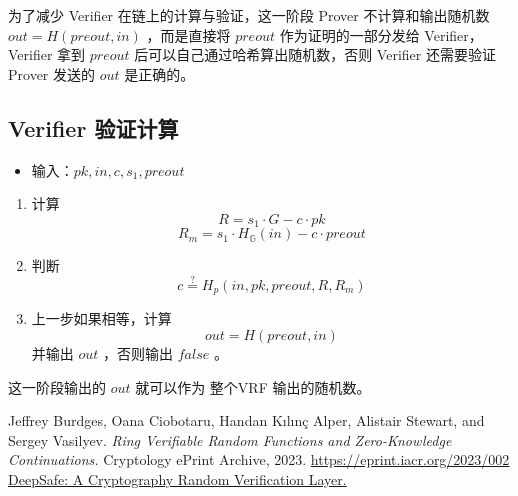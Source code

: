 \documentclass[10pt]{ctexart}
\begin{document}
为了减少 Verifier 在链上的计算与验证，这一阶段 Prover 不计算和输出随机数 $out = H(preout, in)$ ，而是直接将 $preout$ 作为证明的一部分发给 Verifier，Verifier 拿到 $preout$ 后可以自己通过哈希算出随机数，否则 Verifier 还需要验证 Prover 发送的 $out$ 是正确的。

\subsection{Verifier 验证计算}

\begin{itemize}
    \item 输入：$pk, in, c, s_1, preout$
\end{itemize}

\begin{enumerate}
    \item 计算 \[R = s_1 \cdot G - c \cdot pk\] \[R_m = s_1 \cdot  H_{\mathbb{G}}(in) - c \cdot preout\] 
    \item 判断 \[c \overset{?}{=} H_p(in, pk, preout, R, R_m)\]
    \item 上一步如果相等，计算 \[out = H(preout, in)\]并输出 $out$ ，否则输出 $false$ 。
\end{enumerate}

这一阶段输出的 $out$ 就可以作为 整个VRF 输出的随机数。


\begin{thebibliography}{10}
    Jeffrey Burdges, Oana Ciobotaru, Handan Kılınç Alper, Alistair Stewart, and Sergey Vasilyev.
    \textit{Ring Verifiable Random Functions and Zero-Knowledge Continuations.}
    Cryptology ePrint Archive, 2023.
    \url{https://eprint.iacr.org/2023/002}
     \href{https://github.com/deepsafe/whitepaper/blob/main/DeepSafe_A_Cryptography_Random_Verification_Layer.pdf}{DeepSafe: A Cryptography Random Verification Layer.}
\end{thebibliography}
\end{document}
